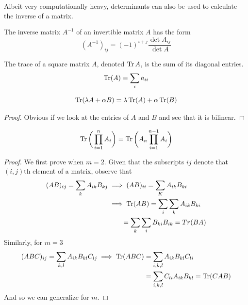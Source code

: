  Albeit very computationally heavy, determinants can also be used to calculate the inverse of a matrix. 

  \begin{theorem}
    \label{thm:inverse-via-the-adjugate}
    The inverse matrix $A^{-1}$ of an invertible matrix $A$ has the form 
    \begin{equation}
      (A^{-1})_{i j} = (-1)^{i+j} \frac{\det{A_{i j}}}{\det{A}}
    \end{equation}
  \end{theorem}

  \begin{definition}
    \label{def:trace-of-a-square-matrix}
    The trace of a square matrix $A$, denoted $\operatorname{Tr}{A}$, is the sum of its diagonal entries. 
    \begin{equation}
      \operatorname{Tr}(A) = \sum_{i} a_{ii}
    \end{equation}
  \end{definition}

  \begin{theorem}
    \label{thm:linearity-of-the-trace}
    \begin{equation}
      \operatorname{Tr}(\lambda A + \alpha B) = \lambda \operatorname{Tr}(A) + \alpha \operatorname{Tr}(B)
    \end{equation}
  \end{theorem}
  \begin{proof}
    Obvious if we look at the entries of $A$ and $B$ and see that it is bilinear.
  \end{proof}

  \begin{theorem}
    \label{thm:cyclic-property-of-the-trace}
    \begin{equation}
      \operatorname{Tr}{\bigg(\prod_{i=1}^n A_i\bigg)} = \operatorname{Tr}{\bigg(A_n \prod_{i=1}^{n-1} A_i\bigg)}
    \end{equation}
  \end{theorem}
  \begin{proof}
    We first prove when $m=2$. Given that the subscripts $i j$ denote that $(i,j)$th element of a matrix, observe that
    \begin{align*}
      (AB)_{ij} = \sum_{k} A_{ik} B_{kj} & \implies (AB)_{ii} = \sum_{K} A_{ik} B_{ki} \\
      & \implies \operatorname{Tr}(AB) = \sum_{i} \sum_{k} A_{ik} B_{ki} \\
      & \qquad= \sum_{k} \sum_{i} B_{ki} B_{ik} = Tr(BA)
    \end{align*}
    Similarly, for $m=3$
    \begin{align*}
      (ABC)_{ij} = \sum_{k,l} A_{ik} B_{kl} C_{lj} \implies \operatorname{Tr}(ABC) & = \sum_{i,k,l} A_{ik} B_{kl} C_{li} \\ 
                                                                     & = \sum_{i,k,l} C_{li} A_{ik} B_{kl} = \operatorname{Tr}(CAB)
    \end{align*}
    And so we can generalize for $m$. 
  \end{proof}

